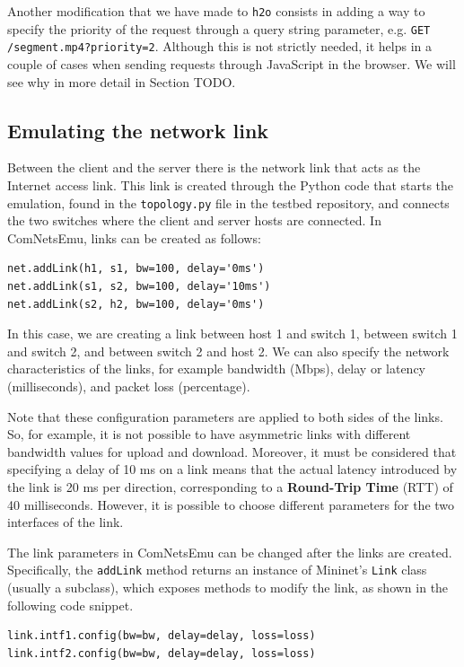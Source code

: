 Another modification that we have made to \texttt{h2o} consists in adding a way to specify the priority of the request through a query string parameter, e.g. \texttt{GET /segment.mp4?priority=2}. Although this is not strictly needed, it helps in a couple of cases when sending requests through JavaScript in the browser. We will see why in more detail in Section TODO.

\subsection{Emulating the network link}
\label{sec:eval/testbed/network}

Between the client and the server there is the network link that acts as the Internet access link. This link is created through the Python code that starts the emulation, found in the \texttt{topology.py} file in the testbed repository, and connects the two switches where the client and server hosts are connected. In ComNetsEmu, links can be created as follows:

\begin{verbatim}
net.addLink(h1, s1, bw=100, delay='0ms')
net.addLink(s1, s2, bw=100, delay='10ms')
net.addLink(s2, h2, bw=100, delay='0ms')
\end{verbatim}

In this case, we are creating a link between host 1 and switch 1, between switch 1 and switch 2, and between switch 2 and host 2. We can also specify the network characteristics of the links, for example bandwidth (Mbps), delay or latency (milliseconds), and packet loss (percentage).

Note that these configuration parameters are applied to both sides of the links. So, for example, it is not possible to have asymmetric links with different bandwidth values for upload and download. Moreover, it must be considered that specifying a delay of 10 ms on a link means that the actual latency introduced by the link is 20 ms per direction, corresponding to a \textbf{Round-Trip Time} (RTT) of 40 milliseconds. However, it is possible to choose different parameters for the two interfaces of the link.

The link parameters in ComNetsEmu can be changed after the links are created. Specifically, the \texttt{addLink} method returns an instance of Mininet's \texttt{Link} class (usually a subclass), which exposes methods to modify the link, as shown in the following code snippet.

\begin{verbatim}
link.intf1.config(bw=bw, delay=delay, loss=loss)
link.intf2.config(bw=bw, delay=delay, loss=loss)
\end{verbatim}

